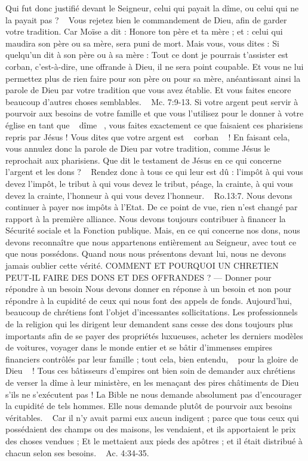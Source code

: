 \begin{multicols}{2}
{Qui fut donc justifié devant le Seigneur, celui qui payait la dîme, ou celui qui ne la payait pas ? ~ Vous rejetez bien le commandement de Dieu, afin de garder 
votre tradition. Car Moïse a dit : Honore ton père et ta mère ; et : celui qui maudira son père ou sa mère, sera puni de mort. Mais vous, vous dites : Si quelqu'un dit à son père ou à sa mère : Tout ce dont je pourrais t’assister est corban, c’est-à-dire, une offrande à Dieu, il ne sera point coupable. 
Et vous ne lui permettez plus de rien faire pour son père ou pour sa mère, anéantissant ainsi la parole de Dieu par votre tradition que vous avez établie. Et vous faites encore beaucoup d’autres choses semblables. ~ Mc. 7:9-13. Si votre argent peut servir à pourvoir aux besoins de votre famille et que vous l’utilisez pour le donner à votre église en tant que ~ dîme ~, vous faites exactement ce que faisaient ces pharisiens repris par Jésus ! Vous dites que votre argent est ~ corban ~ ! En faisant cela, vous annulez donc la parole de Dieu par votre tradition, comme Jésus le reprochait aux pharisiens.
Que dit le testament de Jésus en ce qui concerne l’argent et les dons ?
~ Rendez donc à tous ce qui leur est dû : l’impôt à qui vous devez l’impôt, le tribut à qui vous devez le tribut, péage, la crainte, à qui vous devez la crainte, l’honneur à qui vous devez l'honneur. ~ Ro.13:7. Nous devons continuer à payer nos impôts à l’Etat. De ce point de vue, rien n’est changé par rapport à la première alliance. Nous devons toujours contribuer à financer la Sécurité sociale et la Fonction publique. Mais, en ce qui concerne nos dons, nous devons reconnaître que nous appartenons entièrement au Seigneur, avec tout ce que nous possédons. Quand nous nous présentons devant lui, nous ne devons jamais oublier cette vérité.
COMMENT ET POURQUOI UN CHRETIEN PEUT-IL FAIRE DES DONS ET DES OFFRANDES ?
— Donner pour répondre à un besoin
Nous devons donner en réponse à un besoin et non pour répondre à la cupidité de ceux qui nous font des appels de fonds. Aujourd’hui, beaucoup de chrétiens font l’objet d’incessantes sollicitations. Les professionnels de la religion qui les dirigent leur demandent sans cesse des dons toujours plus importants afin de se payer des propriétés luxueuses, acheter les derniers modèles de voitures, voyager dans le monde entier et se bâtir d’immenses empires financiers contrôlés par leur famille ; tout cela, bien entendu, ~ pour la gloire de Dieu ~ ! Tous ces bâtisseurs d’empires ont bien soin de demander aux chrétiens de verser la dîme à leur ministère, en les menaçant des pires châtiments de Dieu s’ils ne s’exécutent pas ! La Bible ne nous demande absolument pas d’encourager la cupidité de tels hommes. Elle nous demande plutôt de pourvoir aux besoins véritables. ~ Car il n'y avait parmi eux aucun indigent ; parce que tous ceux qui possédaient des champs ou des maisons, les vendaient, et ils apportaient le prix des choses vendues ; Et le mettaient aux pieds des apôtres ; et il était distribué à chacun selon ses besoins. ~ Ac. 4:34-35.
}
\end{multicols}
